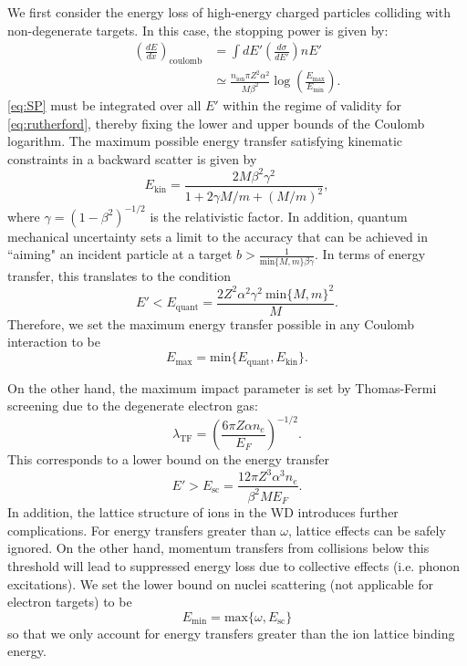 \documentclass[twocolumn,showpacs,preprintnumbers,amsmath,amssymb,prd]{revtex4}
\def\r{\right)}
\def\l{\left(}
\begin{document}
\begin{appendices}
We first consider the energy loss of high-energy charged particles colliding with non-degenerate targets.
In this case, the stopping power is given by:
\begin{align}
\label{eq:SP}
\l \frac{dE}{dx}\r_\text{coulomb} & =  \int dE' \left(\frac{d \sigma}{dE'}\right) n E' \\
& \simeq \frac{n_\text{ion} \pi Z^2 \alpha^2}{M \beta^2} \log {\l\frac{E_{\text{max}}}{E_{\text{min}}}\r}.
\end{align}
\eqref{eq:SP} must be integrated over all $E'$ within the regime of validity for \eqref{eq:rutherford}, thereby fixing the lower and upper bounds of the Coulomb logarithm.
The maximum possible energy transfer satisfying kinematic constraints in a backward scatter is given by
\begin{equation}
E_{\text{kin}} = \frac{2 M \beta^2 \gamma^2}{1+ 2\gamma M/m +(M/m)^2},
\end{equation}
where $\gamma = (1-\beta^2)^{-1/2}$ is the relativistic factor.
In addition, quantum mechanical uncertainty sets a limit to the accuracy that can be achieved in ``aiming" an incident particle at a target $b > \frac{1}{\text{min}\{{M, m}\} \beta \gamma}$.
In terms of energy transfer, this translates to the condition
\begin{equation}
E' < E_\text{quant} = \frac{2 Z^2 \alpha^2 \gamma^2 ~\text{min}\{{M, m}\}^2}{M}.
\end{equation}
Therefore, we set the maximum energy transfer possible in any Coulomb interaction to be
\begin{equation}
E_{\text{max}} = \text{min}\{E_\text{quant}, E_{\text{kin}}\}.
\end{equation}

On the other hand, the maximum impact parameter is set by Thomas-Fermi screening due to the degenerate electron gas:
\begin{equation}
\label{eq:TF}
\lambda_{\text{TF}} = \l \frac{6 \pi Z \alpha n_e}{E_F}\r^{-1/2}.
\end{equation}
This corresponds to a lower bound on the energy transfer
\begin{equation}
E' > E_{\text{sc}} = \frac{12 \pi Z^3 \alpha ^3 n_e}{\beta^2 M E_F}.
\end{equation}
In addition, the lattice structure of ions in the WD introduces further complications. For energy transfers greater than $\omega$, lattice effects can be safely ignored.
On the other hand, momentum transfers from collisions below this threshold will lead to suppressed energy loss due to collective effects (i.e. phonon excitations).
We set the lower bound on nuclei scattering (not applicable for electron targets) to be
\begin{equation}
E_{\text{min}} = \text{max} \{\omega,E_{\text{sc}}\}
\end{equation}
so that we only account for energy transfers greater than the ion lattice binding energy.


\end{appendices}
\end{document}
